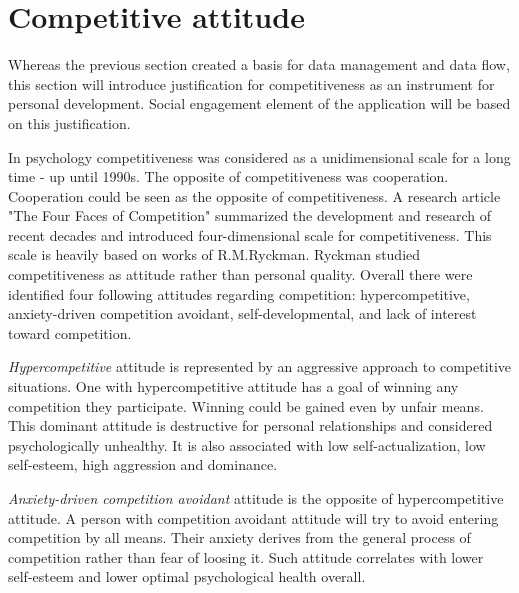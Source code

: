 
\section{Competitive attitude}\label{sec:competitive-attitude}



Whereas the previous section created a basis for data management and data flow,
this section will introduce justification for competitiveness as an instrument for personal development.
Social engagement element of the application will be based on this justification.

In psychology competitiveness was considered as a unidimensional scale for a long time - up until 1990s.
The opposite of competitiveness was cooperation.
Cooperation could be seen as the opposite of competitiveness.
A research article "The Four Faces of Competition" summarized the development and research of recent decades
and introduced four-dimensional scale for competitiveness.\cite{the-four-faces-of-competetition}
This scale is heavily based on works of R.M.Ryckman.\cite{cit-ryckman-hca,cit-ryckman-adca,cit-ryckman-pdca}
Ryckman studied competitiveness as attitude rather than personal quality.
Overall there were identified four following attitudes regarding competition:
hypercompetitive, anxiety-driven competition avoidant, self-developmental, and lack of interest toward competition.

\textit{Hypercompetitive} attitude is represented by an aggressive approach to competitive situations.
One with hypercompetitive attitude has a goal of winning any competition they participate.
Winning could be gained even by unfair means.
This dominant attitude is destructive for personal relationships and considered psychologically unhealthy.
It is also associated with low self-actualization, low self-esteem, high aggression and dominance.\cite{cit-ryckman-hca}

\textit{Anxiety-driven competition avoidant} attitude is the opposite of hypercompetitive attitude.
A person with competition avoidant attitude will try to avoid entering competition by all means.
Their anxiety derives from the general process of competition rather than fear of loosing it.
Such attitude correlates with lower self-esteem and lower optimal psychological health overall.\cite{cit-ryckman-adca}

